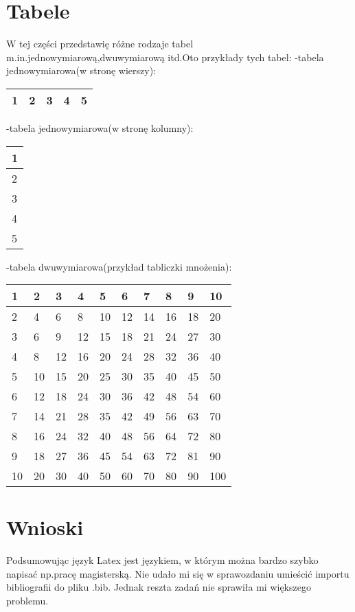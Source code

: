 \documentclass[11pt,a4paper]{article}
\begin{document}
\section{Tabele}\label{sec:table}
W tej części przedstawię różne rodzaje tabel m.in.jednowymiarową,dwuwymiarową itd.\newline Oto przykłady tych tabel:\newline
-tabela jednowymiarowa(w stronę wierszy):\newline

\begin{tabular}{|l|l|l|l|l|}
\hline
1 & 2 & 3 & 4 & 5 \\ \hline
\end{tabular}

-tabela jednowymiarowa(w stronę kolumny):\newline

\begin{tabular}{|l|}
\hline
1 \\ \hline
2 \\ \hline
3 \\ \hline
4 \\ \hline
5 \\ \hline
\end{tabular}

-tabela dwuwymiarowa(przykład tabliczki mnożenia):\newline

\begin{tabular}{|l|l|l|l|l|l|l|l|l|l|}
\hline
1  & 2  & 3  & 4  & 5  & 6  & 7  & 8  & 9  & 10  \\ \hline
2  & 4  & 6  & 8  & 10 & 12 & 14 & 16 & 18 & 20  \\ \hline
3  & 6  & 9  & 12 & 15 & 18 & 21 & 24 & 27 & 30  \\ \hline
4  & 8  & 12 & 16 & 20 & 24 & 28 & 32 & 36 & 40  \\ \hline
5  & 10 & 15 & 20 & 25 & 30 & 35 & 40 & 45 & 50  \\ \hline
6  & 12 & 18 & 24 & 30 & 36 & 42 & 48 & 54 & 60  \\ \hline
7  & 14 & 21 & 28 & 35 & 42 & 49 & 56 & 63 & 70  \\ \hline
8  & 16 & 24 & 32 & 40 & 48 & 56 & 64 & 72 & 80  \\ \hline
9  & 18 & 27 & 36 & 45 & 54 & 63 & 72 & 81 & 90  \\ \hline
10 & 20 & 30 & 40 & 50 & 60 & 70 & 80 & 90 & 100 \\ \hline
\end{tabular}
\section{Wnioski}\label{sec:end}
Podsumowując język Latex jest językiem, w którym można bardzo szybko napisać np.pracę magisterską.\newline
Nie udało mi się w sprawozdaniu umieścić importu bibliografii do pliku .bib.\newline
Jednak reszta zadań nie sprawiła mi większego problemu.
\end{document}

